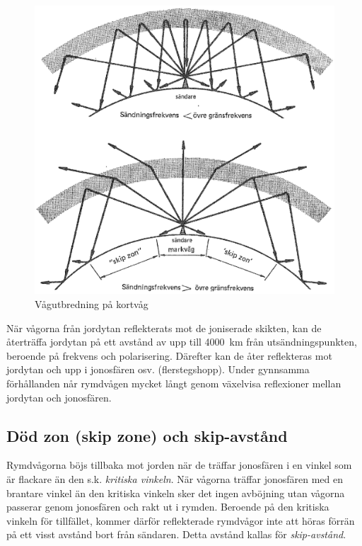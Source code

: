 \begin{figure}
  \includegraphics[width=\textwidth]{images/cropped_pdfs/bild_2_7-11.pdf}
  \caption{Vågutbredning på kortvåg}
  \label{fig:bildII7-11}
\end{figure}

När vågorna från jordytan reflekterats mot de joniserade skikten, kan
de återträffa jordytan på ett avstånd av upp till 4000~km från
utsändningspunkten, beroende på frekvens och polarisering.
Därefter kan de åter reflekteras mot jordytan och upp i jonosfären
osv. (flerstegshopp).
Under gynnsamma förhållanden når rymdvågen mycket långt genom växelvisa
reflexioner mellan jordytan och jonosfären.

\subsection{Död zon (skip zone) och skip-avstånd}

Rymdvågorna böjs tillbaka mot jorden när de träffar jonosfären i en
vinkel som är flackare än den s.k. \emph{kritiska vinkeln}.
När vågorna träffar jonosfären med en brantare vinkel än den kritiska vinkeln
sker det ingen avböjning utan vågorna passerar genom jonosfären och rakt ut
i rymden.
Beroende på den kritiska vinkeln för tillfället, kommer därför reflekterade
rymdvågor inte att höras förrän på ett visst avstånd bort från sändaren.
Detta avstånd kallas för \emph{skip-avstånd}.

